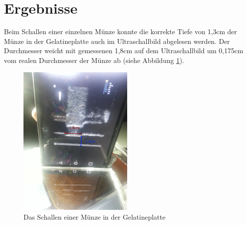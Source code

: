 \section{Ergebnisse}
Beim Schallen einer einzelnen Münze konnte die korrekte Tiefe von 1,3cm der Münze in der Gelatineplatte auch im Ultraschallbild abgelesen werden. Der Durchmesser weicht mit gemessenen 1,8cm auf dem Ultraschallbild um 0,175cm vom realen Durchmesser der Münze ab (siehe Abbildung \ref{fig:1Cent}). 
\clearpage
\begin{figure}[h]
	\centering
	\includegraphics[width=0.5\textwidth]{Bilder/Evaluation/1Cent.jpg}
	\caption{Das Schallen einer Münze in der Gelatineplatte}
	\label{fig:1Cent}
\end{figure}

